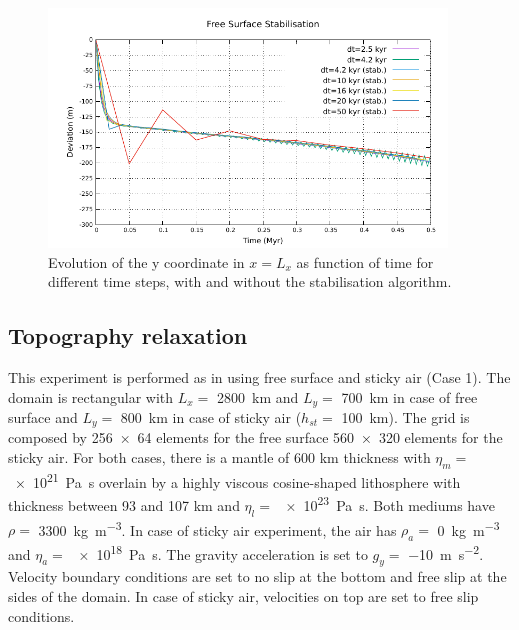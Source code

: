 \documentclass[hidelinks,11pt,a4paper]{article}
\begin{document}
\begin{figure}
\centering
\noindent\includegraphics[width=400px]{./Figures/Kaus_random.pdf}
\caption{Evolution of the y coordinate in $x=L_x$ as function of time for different time steps, with and without the stabilisation algorithm.}
\label{fig:stab}
\end{figure}

\subsection{Topography relaxation}\label{sec:crameri}
This experiment is performed as in \citet{Crameri2012} using free surface and sticky air (Case 1). The domain is rectangular with $L_x=$ \SI{2800}{\km} and $L_y=$ \SI{700}{\km} in case of free surface and $L_y=$ \SI{800}{\km} in case of sticky air ($h_{st}=$ \SI{100}{\km}). The grid is composed by \num{256x64} elements for the free surface \num{560x320} elements for the sticky air. For both cases, there is a mantle of 600 km thickness with $\eta_m=$ \SI{e21}{\pascal\s} overlain by a highly viscous cosine-shaped lithosphere with thickness between 93 and 107 km and $\eta_l=$ \SI{e23}{\pascal\s}. Both mediums have $\rho=$ \SI{3300}{\kg\per\cubic\metre}. In case of sticky air experiment, the air has $\rho_a=$ \SI{0}{\kg\per\cubic\metre} and $\eta_a=$ \SI{e18}{\pascal\s}. The gravity acceleration is set to $g_y=$ \SI{-10}{\metre\per\square\s}. Velocity boundary conditions are set to no slip at the bottom and free slip at the sides of the domain. In case of sticky air, velocities on top are set to free slip conditions.
\end{document}
